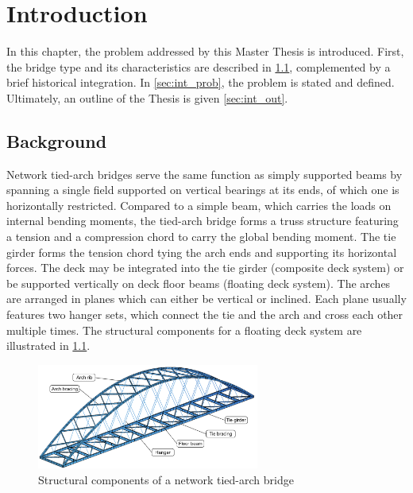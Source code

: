 \chapter{Introduction}\label{sec:intro}
In this chapter, the problem addressed by this Master Thesis is introduced. First, the bridge type and its characteristics are described in \cref{sec:int_back}, complemented by a brief historical integration. In \cref{sec:int_prob}, the problem is stated and defined. Ultimately, an outline of the Thesis is given \cref{sec:int_out}.

\section{Background}\label{sec:int_back}
Network tied-arch bridges serve the same function as simply supported beams by spanning a single field supported on vertical bearings at its ends, of which one is horizontally restricted. Compared to a simple beam, which carries the loads on internal bending moments, the tied-arch bridge forms a truss structure featuring a tension and a compression chord to carry the global bending moment. The tie girder forms the tension chord tying the arch ends and supporting its horizontal forces. The deck may be integrated into the tie girder (composite deck system) or be supported vertically on deck floor beams (floating deck system). The arches are arranged in planes which can either be vertical or inclined. Each plane usually features two hanger sets, which connect the tie and the arch and cross each other multiple times. The structural components for a floating deck system are illustrated in \cref{fig:components_illustration}.
\begin{figure}[H]
    \centering
    \includegraphics[width=0.65\textwidth]{overleaf/Pictures/illustration_components.PNG}
    \caption{Structural components of a network tied-arch bridge}
    \label{fig:components_illustration}
\end{figure}

